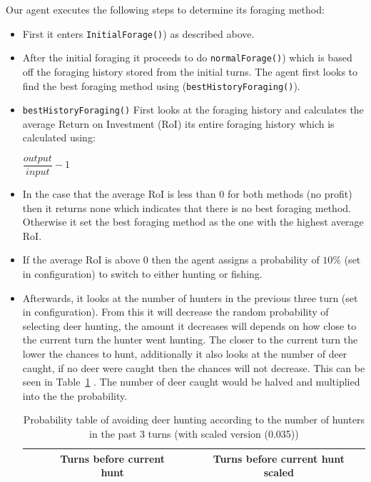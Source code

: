 Our agent executes the following steps to determine its foraging method:
\begin{itemize}
    \item First it enters \texttt{InitialForage()}) as described above.
    \item After the initial foraging it proceeds to do \texttt{normalForage()}) which is based off the foraging history stored from the initial turns. The agent first looks to find the best foraging method using (\texttt{bestHistoryForaging()}).
    \item \texttt{bestHistoryForaging()} First looks at the foraging history and calculates the average Return on Investment (RoI) its entire foraging history which is calculated using:
    \\  \begin{center} $\dfrac{output}{input}-1$ \end{center}
    \item In the case that the average RoI is less than 0 for both methods (no profit) then it returns none which indicates that there is no best foraging method. Otherwise it set the best foraging method as the one with the highest average RoI. 
    \item If the average RoI is above 0 then the agent assigns a probability of $10\%$ (set in configuration) to switch to either hunting or fishing.
    \item Afterwards, it looks at the number of hunters in the previous three turn (set in configuration). From this it will decrease the random probability of selecting deer hunting, the amount it decreases will depends on how close to the current turn the hunter went hunting. The closer to the current turn the lower the chances to hunt, additionally it also looks at the number of deer caught, if no deer were caught then the chances will not decrease. This can be seen in Table~\ref{table:Probability Avoiding Deer Hunting} . The number of deer caught would be halved and multiplied into the the probability.
           {\begin{table}[]
                 \begin{center}
                 \caption{Probability table of avoiding deer hunting according to the number of hunters in the past 3 turns (with scaled version (0.035))}
                 \label{table:Probability Avoiding Deer Hunting}
                        \begin{tabular}{|c|c|c|c|c|c|c|c|c|}
                        \hline
                                                 &   & \multicolumn{3}{c|}{Turns before current   hunt} &         & \multicolumn{3}{c|}{Turns before current   hunt scaled} \\ \hline

\end{tabular}
\end{center}
\end{table}}
\end{itemize}
